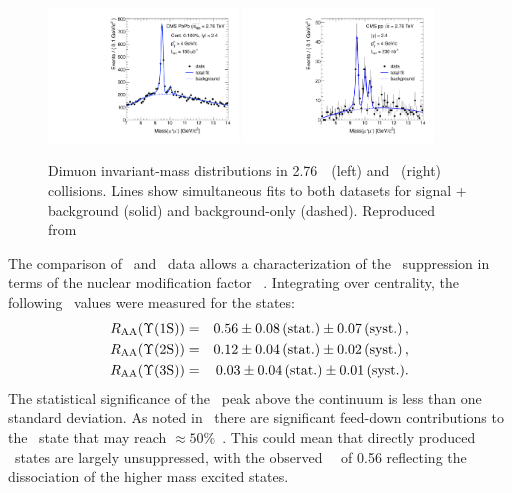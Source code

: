 \begin{figure}[t]
\begin{center}
    \includegraphics[width=0.45\textwidth]{qqbarfigures/hiFitPt4Erf}
    \includegraphics[width=0.45\textwidth]{qqbarfigures/ppFitPt4Erf}
    \caption{Dimuon invariant-mass distributions in 2.76\TeV\ \PbPb\ (left) and \pp\ (right)
collisions.  Lines show simultaneous fits to both
datasets for signal + background (solid) and background-only (dashed).
Reproduced from~\cite{Chatrchyan:2012lxa}}
\label{fig:GR:mass}
\end{center}
\end{figure}

The comparison of \pp\ and \PbPb\ data allows a characterization of the \PgU\ suppression
in terms of the nuclear modification factor \Raa~\cite{Chatrchyan:2012lxa}.
Integrating over centrality, the following \Raa\ values were measured for the \PgUn states:
\begin{eqnarray}
R_\mathrm{AA} (\Upsilon\mathrm{(1S)}) &=& 0.56 \pm 0.08\,\mbox{(stat.)} \pm 0.07\,\mbox{(syst.)} \,, \\
R_\mathrm{AA} (\Upsilon\mathrm{(2S)}) &=& 0.12 \pm 0.04\,\mbox{(stat.)} \pm 0.02\,\mbox{(syst.)} \,, \nonumber \\
R_\mathrm{AA} (\Upsilon\mathrm{(3S)}) &=& 0.03 \pm 0.04\,\mbox{(stat.)} \pm 0.01\,\mbox{(syst.)} .  \nonumber
\end{eqnarray}
The statistical significance of the \PgUc\ peak above the continuum is less than one standard deviation.
As noted in~\cite{Chatrchyan:2012lxa} there are significant feed-down contributions to
the \PgUa\ state that may reach $\approx 50\%$~\cite{Affolder:1999wm, Aaij:2012se}.
This could mean that directly produced \PgUa\ states are largely unsuppressed, with
the observed \PgUa\ \Raa\ of 0.56 reflecting the dissociation of the higher 
mass excited states.


